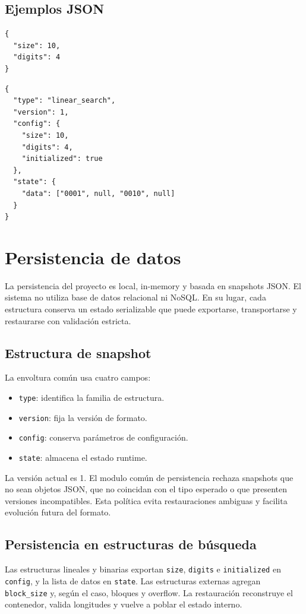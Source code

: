 \documentclass[12pt,onecolumn]{IEEEtran}
\begin{document}
\subsection{Ejemplos JSON}
\begin{lstlisting}[style=cs2json,caption={Ejemplo de creación de estructura de búsqueda},label={lst:json-search-create}]
{
  "size": 10,
  "digits": 4
}
\end{lstlisting}

\begin{lstlisting}[style=cs2json,caption={Ejemplo de snapshot versionado},label={lst:json-snapshot}]
{
  "type": "linear_search",
  "version": 1,
  "config": {
    "size": 10,
    "digits": 4,
    "initialized": true
  },
  "state": {
    "data": ["0001", null, "0010", null]
  }
}
\end{lstlisting}

\section{Persistencia de datos}
La persistencia del proyecto es local, in-memory y basada en snapshots JSON. El sistema no utiliza base de datos relacional ni NoSQL. En su lugar, cada estructura conserva un estado serializable que puede exportarse, transportarse y restaurarse con validación estricta.

\subsection{Estructura de snapshot}
La envoltura común usa cuatro campos:
\begin{itemize}
  \item \texttt{type}: identifica la familia de estructura.
  \item \texttt{version}: fija la versión de formato.
  \item \texttt{config}: conserva parámetros de configuración.
  \item \texttt{state}: almacena el estado runtime.
\end{itemize}

La versión actual es 1. El modulo común de persistencia rechaza snapshots que no sean objetos JSON, que no coincidan con el tipo esperado o que presenten versiones incompatibles. Esta política evita restauraciones ambiguas y facilita evolución futura del formato.

\subsection{Persistencia en estructuras de búsqueda}
Las estructuras lineales y binarias exportan \texttt{size}, \texttt{digits} e \texttt{initialized} en \texttt{config}, y la lista de datos en \texttt{state}. Las estructuras externas agregan \texttt{block\_size} y, según el caso, bloques y overflow. La restauración reconstruye el contenedor, valida longitudes y vuelve a poblar el estado interno.
\end{document}
